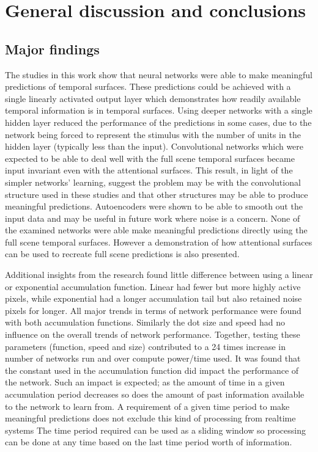 \chapter{General discussion and conclusions}

\section{Major findings}
The studies in this work show that neural networks were able to make meaningful predictions of temporal surfaces.
These predictions could be achieved with a single linearly activated output layer which demonstrates how readily available temporal information is in temporal surfaces.
Using deeper networks with a single hidden layer reduced the performance of the predictions in some cases, due to the network being forced to represent the stimulus with the number of units in the hidden layer (typically less than the input). 
Convolutional networks which were expected to be able to deal well with the full scene temporal surfaces became input invariant even with the attentional surfaces.
This result, in light of the simpler networks' learning, suggest the problem may be with the convolutional structure used in these studies and that other structures may be able to produce meaningful predictions.
Autoencoders were shown to be able to smooth out the input data and may be useful in future work where noise is a concern. 
None of the examined networks were able make meaningful predictions directly using the full scene temporal surfaces.
However a demonstration of how attentional surfaces can be used to recreate full scene predictions is also presented. 

Additional insights from the research found little difference between using a linear or exponential accumulation function. 
Linear had fewer but more highly active pixels, while exponential had a longer accumulation tail but also retained noise pixels for longer.
All major trends in terms of network performance were found with both accumulation functions.
Similarly the dot size and speed had no influence on the overall trends of network performance. 
Together, testing these parameters (function, speed and size) contributed to a 24 times increase in number of networks run and over compute power/time used. 
It was found that the constant used in the accumulation function did impact the performance of the network.
Such an impact is expected; as the amount of time in a given accumulation period decreases so does the amount of past information available to the network to learn from. 
A requirement of a given time period to make meaningful predictions does not exclude this kind of processing from realtime systems 
The time period required can be used as a sliding window so processing can be done at any time based on the last time period worth of information. 

